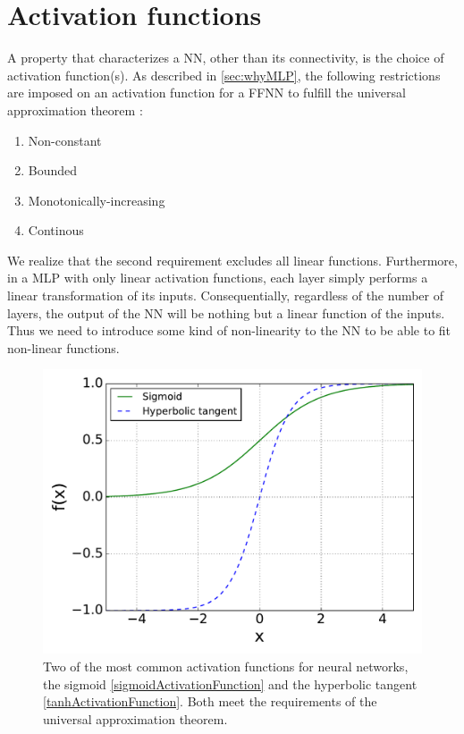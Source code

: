 \documentclass[twoside,english]{uiofysmaster}
\begin{document}
\section{Activation functions} \label{sec:activationFunctions}
A property that characterizes a NN, other than its connectivity, is the choice of activation function(s). 
As described in \autoref{sec:whyMLP}, the following restrictions are imposed on an activation function for a FFNN
to fulfill the universal approximation theorem \cite{Hornik89}:
\begin{enumerate}
 \item Non-constant
 \item Bounded
 \item Monotonically-increasing
 \item Continous
\end{enumerate}
We realize that the second requirement excludes all linear functions. Furthermore, in a MLP with only linear activation functions, each 
layer simply performs a linear transformation of its inputs. Consequentially, regardless of the number of layers, 
the output of the NN will be nothing but a linear function of the inputs. Thus we need to introduce some kind of 
non-linearity to the NN to be able to fit non-linear functions. 
\begin{figure}
\centering
  \includegraphics[width = 0.7\linewidth]{Figures/Theory/activationFunctions.pdf}
  \caption{Two of the most common activation functions for neural networks, the sigmoid \eqref{sigmoidActivationFunction} and 
           the hyperbolic tangent \eqref{tanhActivationFunction}. Both meet the requirements
	   of the universal approximation theorem.}
  \label{fig:SigmoidActivationFunctions}
\end{figure}
\end{document}

